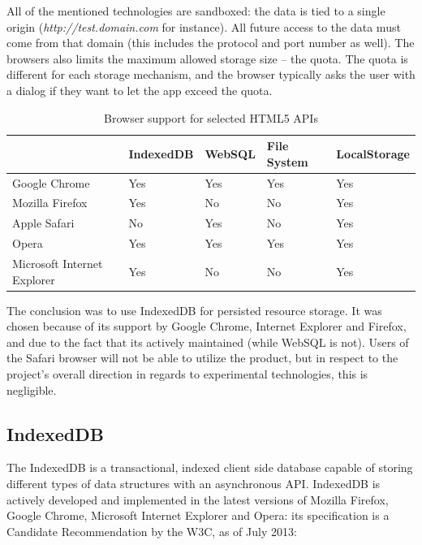 All of the mentioned technologies are sandboxed: the data is tied to a single origin (\emph{http://test.domain.com} for instance). All future access to the data must come from that domain (this includes the protocol and port number as well). The browsers also limits the maximum allowed storage size – the quota. The quota is different for each storage mechanism, and the browser typically asks the user with a dialog if they want to let the app exceed the quota.

\begin{table}
    \begin{tabular}{|l|l|l|l|l|}
    \hline
                       & IndexedDB & WebSQL & File System & LocalStorage \\ \hline
    Google Chrome               & Yes       & Yes    & Yes  & Yes                      \\ \hline
    Mozilla Firefox             & Yes       & \cellcolor{red}No  & \cellcolor{red}No   & Yes                        \\ \hline
    Apple Safari                & \cellcolor{red}No        & Yes  & \cellcolor{red}No    & Yes                        \\ \hline
    Opera                       & Yes       & Yes    & Yes  & Yes                      \\ \hline
    Microsoft Internet Explorer & Yes       & \cellcolor{red}No  & \cellcolor{red}No   & Yes                        \\ \hline
    \end{tabular}
    \caption {Browser support for selected HTML5 APIs}
\end{table}

The conclusion was to use IndexedDB for persisted resource storage. It was chosen because of its support by Google Chrome, Internet Explorer and Firefox, and due to the fact that its actively maintained (while WebSQL is not). Users of the Safari browser will not be able to utilize the product, but in respect to the project's overall direction in regards to experimental technologies, this is negligible.

\subsection{IndexedDB}
\label{sec:indexeddb}
The IndexedDB is a transactional, indexed client side database capable of storing different types of data structures with an asynchronous API. IndexedDB is actively developed and implemented in the latest versions of Mozilla Firefox, Google Chrome, Microsoft Internet Explorer and Opera: its specification is a Candidate Recommendation by the W3C, as of July 2013\cite{IndexedDB:Online}:

